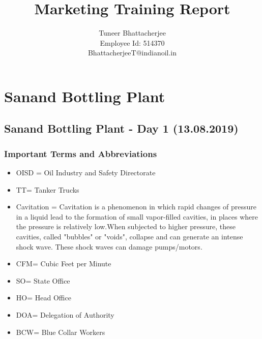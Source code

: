 \documentclass{report}
\title{Marketing Training Report}
\author{Tuneer Bhattacherjee\\Employee Id: 514370\\BhattacherjeeT@indianoil.in}
\begin{document}
	\maketitle
	\pagebreak
	\tableofcontents
	\pagebreak
	\chapter{Sanand Bottling Plant}
	\section{Sanand Bottling Plant - Day 1 (13.08.2019)}
	\subsection{Important Terms and Abbreviations}
	\begin{itemize}
		\item OISD = Oil Industry and Safety Directorate
		\item TT= Tanker Trucks
		\item Cavitation = Cavitation is a phenomenon in which rapid changes of pressure in a liquid lead to the formation of small vapor-filled cavities, in places where the pressure is relatively low.When subjected to higher pressure, these cavities, called "bubbles" or "voids", collapse and can generate an intense shock wave. These shock waves can damage pumps/motors.
		\item CFM= Cubic Feet per Minute
		\item SO= State Office
		\item HO= Head Office
		\item DOA= Delegation of Authority
		\item BCW= Blue Collar Workers
	\end{itemize}
\end{document}
